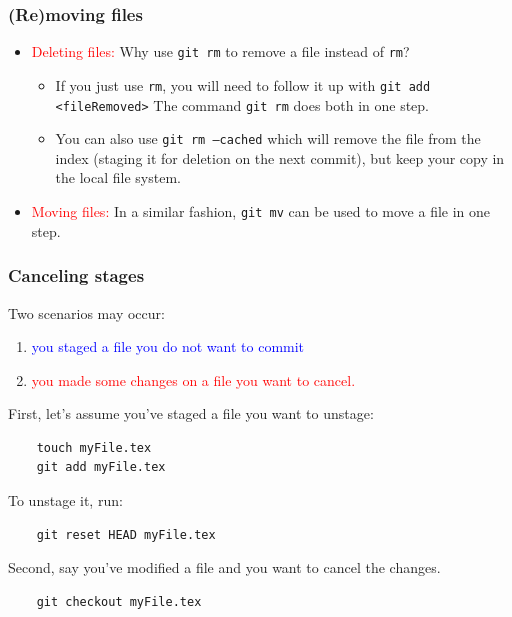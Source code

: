 %
%
\begin{frame}[fragile]
  \frametitle{
    (Re)moving files
  }

  \begin{itemize}
  \item
    \textcolor{red}{Deleting files:} Why use {\tt git rm} to remove a file instead of {\tt rm}?
    \begin{itemize}
    \item
      If you just use {\tt rm}, you will need to follow it up with {\tt git add <fileRemoved>} The command {\tt  git rm} does both in one step.
    \item
      You can also use {\tt git rm --cached} which will remove the file from the index (staging it for deletion on the next commit), but keep your copy in the local file system.
      \end{itemize}
  \item
    \textcolor{red}{Moving files:} In a similar fashion, {\tt git mv} can be used to move a file in one step.
  \end{itemize}

\end{frame}

%
%
\begin{frame}[fragile]
  \frametitle{
    Canceling stages
  }
  
  Two scenarios may occur:
  \begin{enumerate}
  \item
    \textcolor{blue}{you staged a file you do not want to commit}
  \item
    \textcolor{red}{you made some changes on a file you want to cancel.}
  \end{enumerate}

  First, let's assume you've staged a file you want to unstage:

  \begin{lstlisting}
    touch myFile.tex
    git add myFile.tex
  \end{lstlisting}

  To unstage it, run:

  \begin{lstlisting}
    git reset HEAD myFile.tex
  \end{lstlisting}

  Second, say you've modified a file and you want to cancel the changes.
  \begin{lstlisting}
    git checkout myFile.tex
  \end{lstlisting}

  
\end{frame}

